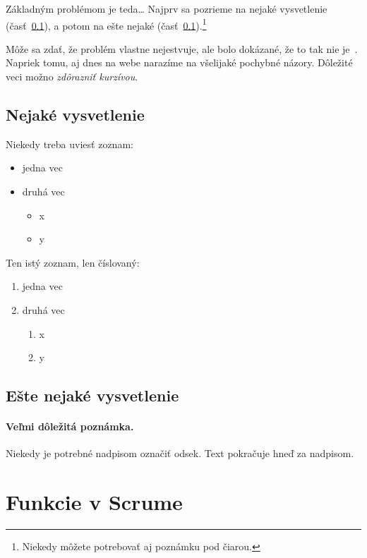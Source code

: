 \documentclass[10pt,twoside,slovak,a4paper]{article}
\begin{document}
Základným problémom je teda\ldots{} Najprv sa pozrieme na nejaké vysvetlenie (časť~\ref{ina:nejake}), a potom na ešte nejaké (časť~\ref{ina:nejake}).\footnote{Niekedy môžete potrebovať aj poznámku pod čiarou.}

Môže sa zdať, že problém vlastne nejestvuje\cite{Coplien:MPD}, ale bolo dokázané, že to tak nie je~\cite{Czarnecki:Staged, Czarnecki:Progress}. Napriek tomu, aj dnes na webe narazíme na všelijaké pochybné názory\cite{PLP-Framework}. Dôležité veci možno \emph{zdôrazniť kurzívou}.


\subsection{Nejaké vysvetlenie} \label{ina:nejake}

Niekedy treba uviesť zoznam:

\begin{itemize}
\item jedna vec
\item druhá vec
	\begin{itemize}
	\item x
	\item y
	\end{itemize}
\end{itemize}

Ten istý zoznam, len číslovaný:

\begin{enumerate}
\item jedna vec
\item druhá vec
	\begin{enumerate}
	\item x
	\item y
	\end{enumerate}
\end{enumerate}


\subsection{Ešte nejaké vysvetlenie} \label{ina:este}

\paragraph{Veľmi dôležitá poznámka.}
Niekedy je potrebné nadpisom označiť odsek. Text pokračuje hneď za nadpisom.



\section{Funkcie v Scrume} \label{funkcie}
\end{document}
